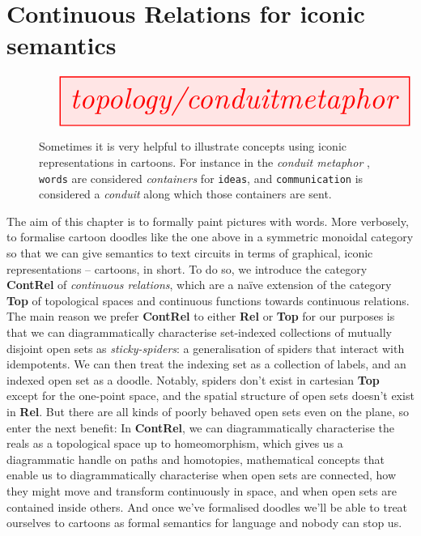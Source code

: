 \section{Continuous Relations for iconic semantics}\label{sec:contrelintro}

\begin{figure}[h!]
\centering
\[\resizebox{\textwidth}{!}{\tikzfig{topology/conduitmetaphor}}\]
\caption{Sometimes it is very helpful to illustrate concepts using iconic representations in cartoons. For instance in the \emph{conduit metaphor} \citep{reddy_conduit_nodate}, \texttt{words} are considered \emph{containers} for \texttt{ideas}, and \texttt{communication} is considered a \emph{conduit} along which those containers are sent.}
\end{figure}

The aim of this chapter is to formally paint pictures with words. More verbosely, to formalise cartoon doodles like the one above in a symmetric monoidal category so that we can give semantics to text circuits in terms of graphical, iconic representations -- cartoons, in short. To do so, we introduce the category \textbf{ContRel} of \emph{continuous relations}, which are a na\"{i}ve extension of the category \textbf{Top} of topological spaces and continuous functions towards continuous relations.\\

The main reason we prefer \textbf{ContRel} to either \textbf{Rel} or \textbf{Top} for our purposes is that we can diagrammatically characterise set-indexed collections of mutually disjoint open sets as \emph{sticky-spiders}: a generalisation of spiders that interact with idempotents. We can then treat the indexing set as a collection of labels, and an indexed open set as a doodle. Notably, spiders don't exist in cartesian \textbf{Top} except for the one-point space, and the spatial structure of open sets doesn't exist in \textbf{Rel}. But there are all kinds of poorly behaved open sets even on the plane, so enter the next benefit: In \textbf{ContRel}, we can diagrammatically characterise the reals as a topological space up to homeomorphism, which gives us a diagrammatic handle on paths and homotopies, mathematical concepts that enable us to diagrammatically characterise when open sets are connected, how they might move and transform continuously in space, and when open sets are contained inside others. And once we've formalised doodles we'll be able to treat ourselves to cartoons as formal semantics for language and nobody can stop us.

